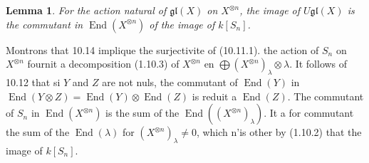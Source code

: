 \documentclass[11pt,a4paper]{article}
\theoremstyle{plain}
\newtheorem{lemma}[theorem]{Lemma}
\theoremstyle{definition}
\DeclareMathOperator{\End}{End}
\begin{document}
\begin{lemma}
For the action natural of $\mathfrak{gl}(X)$ on $X^{\otimes n}$, the image of $U\mathfrak{gl}(X)$ is the commutant in $\End(X^{\otimes n})$ of the image of $k[S_n]$.
\end{lemma}

Montrons that 10.14 implique the surjectivite of (10.11.1). the action of $S_n$ on $X^{\otimes n}$ fournit a decomposition (1.10.3) of $X^{\otimes n}$ en $\bigoplus (X^{\otimes n})_\lambda \otimes \lambda$. It follows of 10.12 that si $Y$ and $Z$ are not nuls, the commutant of $\End(Y)$ in $\End(Y \otimes Z) = \End(Y) \otimes \End(Z)$ is reduit a $\End(Z)$. The commutant of $S_n$ in $\End(X^{\otimes n})$ is the sum of the $\End((X^{\otimes n})_\lambda)$. It a for commutant the sum of the $\End(\lambda)$ for $(X^{\otimes n})_\lambda \neq 0$, which n'is other by (1.10.2) that the image of $k[S_n]$.
\end{document}

